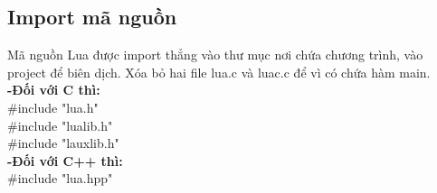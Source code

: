 \documentclass[12pt]{article}
\begin{document}
\subsection{Import mã nguồn}
Mã nguồn Lua được import thẳng vào thư mục nơi chứa chương trình, vào project để biên dịch. Xóa bỏ hai file lua.c và luac.c để vì có chứa hàm main. \\
\textbf{-Đối với C thì:} \\
\#include "lua.h" \\
\#include "lualib.h" \\
\#include "lauxlib.h" \\
\textbf{-Đối với C++ thì:} \\
\#include "lua.hpp"
\end{document}
